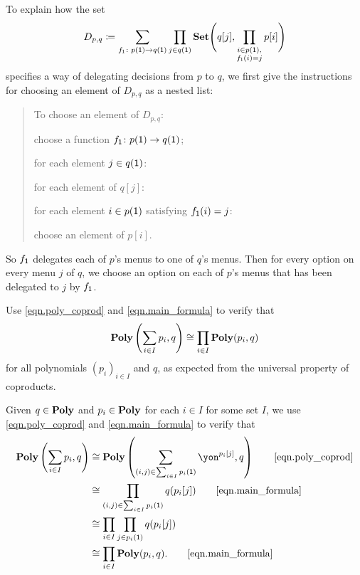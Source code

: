 \documentclass[Book-Poly]{subfiles}
\begin{document}
\begin{exercise}
\begin{solution}
\begin{longenum}
\item To explain how the set
\[
	D_{p,q} \coloneqq \sum_{f_{\textsf{1}}\colon p(\textsf{1})\to q(\textsf{1})}\prod_{j\in q(\textsf{1})}\mathbf{Set}\Bigg(q[j],\prod_{\substack{i \in p(\textsf{1}), \\ f_{\textsf{1}}(i) = j}}p[i]\Bigg)
\]
specifies a way of delegating decisions from $p$ to $q$, we first give the instructions for choosing an element of $D_{p,q}$ as a nested list:
\begin{quote}
To choose an element of $D_{p,q}$:
\begin{longenum}
    \item choose a function $f_{\textsf{1}} \colon p(\textsf{1}) \to q(\textsf{1})$;
    \item for each element $j \in q(\textsf{1})$:
    \begin{longenum}
        \item for each element of $q[j]$:
        \begin{longenum}
            \item for each element $i \in p(\textsf{1})$ satisfying $f_{\textsf{1}}(i) = j$:
            \begin{longenum}
                \item choose an element of $p[i]$.
            \end{longenum}
        \end{longenum}
    \end{longenum}
\end{longenum}
\end{quote}
So $f_{\textsf{1}}$ delegates each of $p$'s menus to one of $q$'s menus.
Then for every option on every menu $j$ of $q$, we choose an option on each of $p$'s menus that has been delegated to $j$ by $f_{\textsf{1}}$.
\end{longenum}
\end{solution}
\end{exercise}

\begin{exercise}%
Use \eqref{eqn.poly_coprod} and \eqref{eqn.main_formula} to verify that
\[
    \mathbf{Poly}\left(\sum_{i \in I} p_i, q\right) \cong \prod_{i \in I} \mathbf{Poly}(p_i, q)
\]
for all polynomials $(p_i)_{i \in I}$ and $q$, as expected from the universal property of coproducts.
\begin{solution}
Given $q \in \mathbf{Poly}$ and $p_i \in \mathbf{Poly}$ for each $i \in I$ for some set $I$, we use \eqref{eqn.poly_coprod} and \eqref{eqn.main_formula} to verify that
\begin{align*}
    \poly\left(\sum_{i \in I} p_i, q\right)
    &\iso \poly\left(\sum_{(i,j) \in \sum_{i \in I} p_i(\1)} \yon^{p_i[j]}, q\right)
    \tag*{\eqref{eqn.poly_coprod}} \\
    &\iso \prod_{(i,j) \in \sum_{i \in I} p_i(\1)} q(p_i[j])
    \tag*{\eqref{eqn.main_formula}} \\
    &\iso \prod_{i \in I} \prod_{j \in p_i(\1)} q(p_i[j]) \\
    &\iso \prod_{i \in I} \poly(p_i, q).
    \tag*{\eqref{eqn.main_formula}}
\end{align*}
\end{solution}
\end{exercise}
\end{document}
